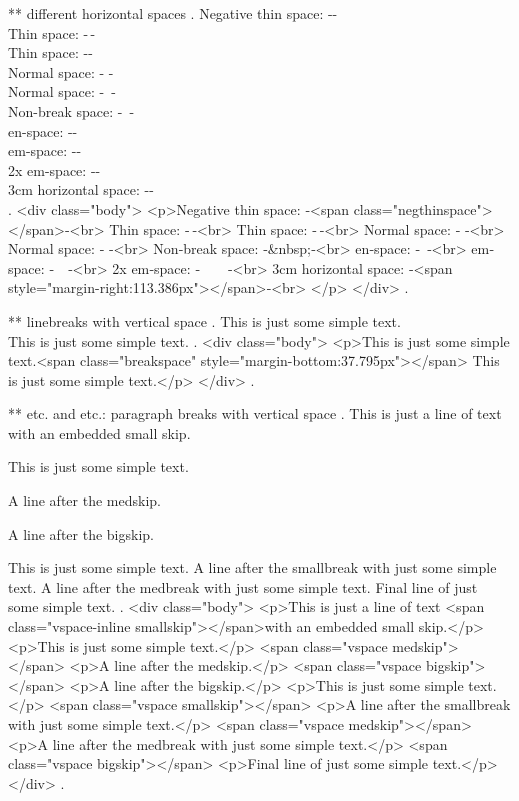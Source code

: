 ** different horizontal spaces
.
Negative thin space: -\negthinspace- \\
Thin space: -\,- \\
Thin space: -\thinspace- \\
Normal space: - - \\
Normal space: -\ - \\
Non-break space: -~- \\
en-space: -\enspace- \\
em-space: -\quad- \\
2x em-space: -\qquad-\\
3cm horizontal space: -\hspace{3cm}- \\
.
<div class="body">
<p>Negative thin space: ‐<span class="negthinspace"></span>‐<br>
Thin space: ‐ ‐<br>
Thin space: ‐ ‐<br>
Normal space: ‐ ‐<br>
Normal space: ‐​ ‐<br>
Non‐break space: ‐&nbsp;‐<br>
en‐space: ‐ ‐<br>
em‐space: ‐ ‐<br>
2x em‐space: ‐  ‐<br>
3cm horizontal space: ‐<span style="margin-right:113.386px"></span>‐<br>
</p>
</div>
.


** linebreaks with vertical space
.
This is just some simple text.\\[1cm]
This is just some simple text.
.
<div class="body">
<p>This is just some simple text.<span class="breakspace" style="margin-bottom:37.795px"></span>
This is just some simple text.</p>
</div>
.


** \smallskip etc. and \smallbreak etc.: paragraph breaks with vertical space
.
This is just a line of text \smallskip with an embedded small skip.

This is just some simple text.

\medskip
A line after the medskip.

\bigskip

A line after the bigskip.

This is just some simple text.
\smallbreak
A line after the smallbreak with just some simple text.
\medbreak
A line after the medbreak with just some simple text.
\bigbreak
Final line of just some simple text.
.
<div class="body">
<p>This is just a line of text <span class="vspace-inline smallskip"></span>with an embedded small skip.</p>
<p>This is just some simple text.</p>
<span class="vspace medskip"></span>
<p>A line after the medskip.</p>
<span class="vspace bigskip"></span>
<p>A line after the bigskip.</p>
<p>This is just some simple text.</p>
<span class="vspace smallskip"></span>
<p>A line after the smallbreak with just some simple text.</p>
<span class="vspace medskip"></span>
<p>A line after the medbreak with just some simple text.</p>
<span class="vspace bigskip"></span>
<p>Final line of just some simple text.</p>
</div>
.


